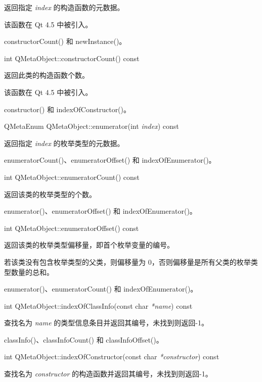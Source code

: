 返回指定 \emph{index} 的构造函数的元数据。

该函数在 Qt 4.5 中被引入。

\begin{seeAlso}
constructorCount() 和 newInstance()。
\end{seeAlso}

int QMetaObject::constructorCount() const

返回此类的构造函数个数。

该函数在 Qt 4.5 中被引入。

\begin{seeAlso}
constructor() 和 indexOfConstructor()。
\end{seeAlso}

QMetaEnum QMetaObject::enumerator(int \emph{index}) const

返回指定 \emph{index} 的枚举类型的元数据。

\begin{seeAlso}
enumeratorCount()、enumeratorOffset() 和 indexOfEnumerator()。
\end{seeAlso}

int QMetaObject::enumeratorCount() const

返回该类的枚举类型的个数。

\begin{seeAlso}
enumerator()、enumeratorOffset() 和 indexOfEnumerator()。
\end{seeAlso}
	
int QMetaObject::enumeratorOffset() const

返回该类的枚举类型偏移量，即首个枚举变量的编号。

若该类没有包含枚举类型的父类，则偏移量为 0，否则偏移量是所有父类的枚举类型数量的总和。

\begin{seeAlso}
enumerator()、enumeratorCount() 和 indexOfEnumerator()。
\end{seeAlso}

int QMetaObject::indexOfClassInfo(const char \emph{*name}) const

查找名为 \emph{name} 的类型信息条目并返回其编号，未找到则返回-1。

\begin{seeAlso}
classInfo()、classInfoCount() 和 classInfoOffset()。
\end{seeAlso}

int QMetaObject::indexOfConstructor(const char \emph{*constructor}) const

查找名为 \emph{constructor} 的构造函数并返回其编号，未找到则返回-1。

